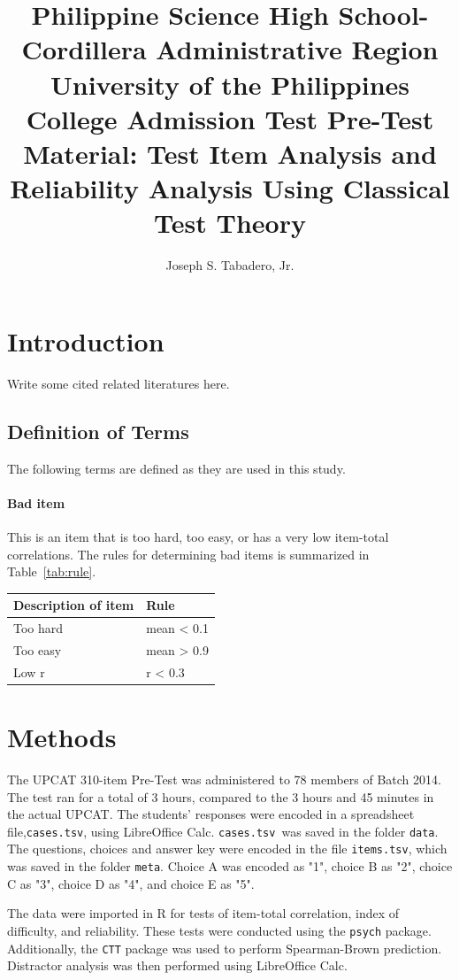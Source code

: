 \documentclass[10pt,man]{apa6}\usepackage{graphicx, color}
\title{Philippine Science High School-Cordillera Administrative Region University of the Philippines College Admission Test Pre-Test Material: Test Item Analysis and Reliability Analysis Using Classical Test Theory}
\author{Joseph S. Tabadero, Jr.}
\affiliation{Science, Mathematics, and Technology Department}
\newcommand{\Cases}{\texttt{cases.tsv}}
\newcommand{\Items}{\texttt{items.tsv}}
\begin{document}
\maketitle
\tableofcontents
\listoftables
\listoflistings
\section{Introduction}

Write some cited related literatures here.

\subsection{Definition of Terms}
The following terms are defined as they are used in this study.

\paragraph{Bad item} This is an item that is too hard, too easy, or has a very low item-total correlations. The rules for determining bad items is summarized in Table~\ref{tab:rule}.

\begin{flushleft}
\begin{tabular}{ll}
\toprule
Description of item & Rule \\
\midrule
Too hard & mean < 0.1\\
Too easy & mean > 0.9\\
Low r & r < 0.3\\
\bottomrule
\end{tabular}
\end{flushleft}

\section{Methods}
The UPCAT 310-item Pre-Test was administered to 78 members of Batch 2014. The test ran for a total of 3 hours, compared to the 3 hours and 45 minutes in the actual UPCAT. The students' responses were encoded in a spreadsheet file,\Cases, using LibreOffice Calc. \Cases\ was saved in the folder \texttt{data}. The questions, choices and answer key were encoded in the file \Items, which was saved in the folder \texttt{meta}. Choice A was encoded as "1", choice B as "2", choice C as "3", choice D as "4", and choice E as "5". 

The data were imported in R for tests of item-total correlation, index of difficulty, and reliability. These tests were conducted using the \texttt{psych} package. Additionally, the \texttt{CTT} package was used to perform Spearman-Brown prediction. Distractor analysis was then performed using LibreOffice Calc. 
\end{document}
